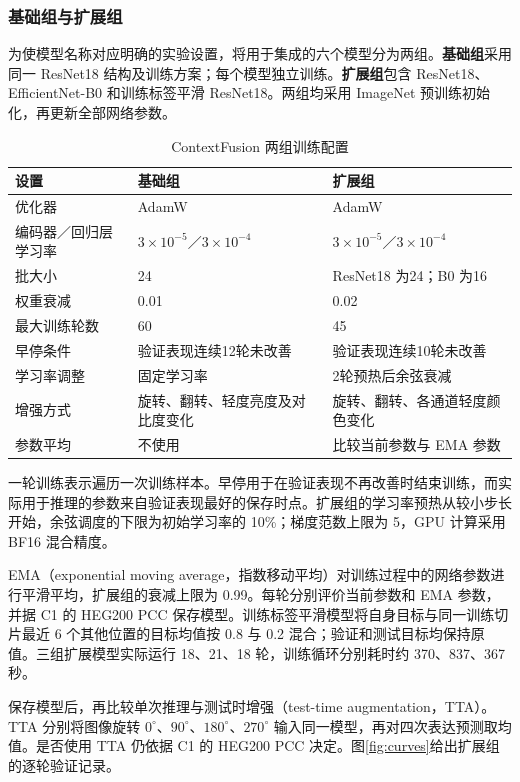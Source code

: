 \documentclass[UTF8,a4paper,11pt,fontset=fandol]{ctexart}
\begin{document}
\subsubsection{基础组与扩展组}
为使模型名称对应明确的实验设置，将用于集成的六个模型分为两组。\textbf{基础组}采用同一 ResNet18 结构及训练方案；每个模型独立训练。\textbf{扩展组}包含 ResNet18、EfficientNet-B0 和训练标签平滑 ResNet18。两组均采用 ImageNet 预训练初始化，再更新全部网络参数。


\begin{table}[H]\centering\small
\caption{ContextFusion 两组训练配置}\label{tab:training}
\begin{tabularx}{\textwidth}{lYY}\toprule
设置&基础组&扩展组\\\midrule
优化器&AdamW&AdamW\\
编码器／回归层学习率&$3\times10^{-5}$／$3\times10^{-4}$&$3\times10^{-5}$／$3\times10^{-4}$\\
批大小&24&ResNet18 为24；B0 为16\\
权重衰减&0.01&0.02\\
最大训练轮数&60&45\\
早停条件&验证表现连续12轮未改善&验证表现连续10轮未改善\\
学习率调整&固定学习率&2轮预热后余弦衰减\\
增强方式&旋转、翻转、轻度亮度及对比度变化&旋转、翻转、各通道轻度颜色变化\\
参数平均&不使用&比较当前参数与 EMA 参数\\\bottomrule
\end{tabularx}
\end{table}

一轮训练表示遍历一次训练样本。早停用于在验证表现不再改善时结束训练，而实际用于推理的参数来自验证表现最好的保存时点。扩展组的学习率预热从较小步长开始，余弦调度的下限为初始学习率的 10\%；梯度范数上限为 5，GPU 计算采用 BF16 混合精度。

EMA（exponential moving average，指数移动平均）对训练过程中的网络参数进行平滑平均，扩展组的衰减上限为 0.99。每轮分别评价当前参数和 EMA 参数，并据 C1 的 HEG200 PCC 保存模型。训练标签平滑模型将自身目标与同一训练切片最近 6 个其他位置的目标均值按 0.8 与 0.2 混合；验证和测试目标均保持原值。三组扩展模型实际运行 18、21、18 轮，训练循环分别耗时约 370、837、367 秒。

保存模型后，再比较单次推理与测试时增强（test-time augmentation，TTA）。TTA 分别将图像旋转 $0^\circ$、$90^\circ$、$180^\circ$、$270^\circ$ 输入同一模型，再对四次表达预测取均值。是否使用 TTA 仍依据 C1 的 HEG200 PCC 决定。图\ref{fig:curves}给出扩展组的逐轮验证记录。
\end{document}

